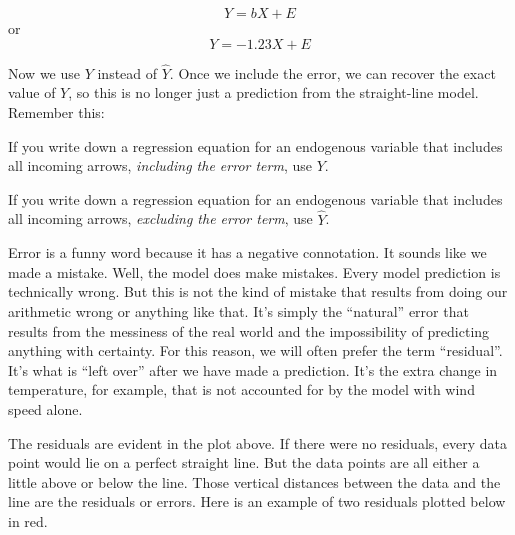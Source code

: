 \documentclass[
]{book}
\begin{document}
\[
Y = bX + E
\]
or
\[
Y = -1.23X + E
\]

Now we use \(Y\) instead of \(\hat{Y}\). Once we include the error, we can recover the exact value of \(Y\), so this is no longer just a prediction from the straight-line model. Remember this:

If you write down a regression equation for an endogenous variable that includes all incoming arrows, \emph{including the error term}, use \(Y\).

If you write down a regression equation for an endogenous variable that includes all incoming arrows, \emph{excluding the error term}, use \(\hat{Y}\).

Error is a funny word because it has a negative connotation. It sounds like we made a mistake. Well, the model does make mistakes. Every model prediction is technically wrong. But this is not the kind of mistake that results from doing our arithmetic wrong or anything like that. It's simply the ``natural'' error that results from the messiness of the real world and the impossibility of predicting anything with certainty. For this reason, we will often prefer the term ``residual''. It's what is ``left over'' after we have made a prediction. It's the extra change in temperature, for example, that is not accounted for by the model with wind speed alone.

The residuals are evident in the plot above. If there were no residuals, every data point would lie on a perfect straight line. But the data points are all either a little above or below the line. Those vertical distances between the data and the line are the residuals or errors. Here is an example of two residuals plotted below in red.
\end{document}
